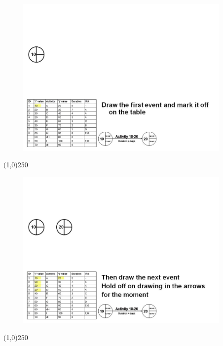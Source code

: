 \begin{frame}
\begin{figure}
	\centering
		\includegraphics[width = 10.5cm]{oldnotes/Slide81.jpg}
\end{figure}
\end{frame}
\begin{center}\line(1,0){250}\end{center}


\begin{frame}
\begin{figure}
	\centering
		\includegraphics[width = 10.5cm]{oldnotes/Slide82.jpg}
\end{figure}
\end{frame}
\begin{center}\line(1,0){250}\end{center}


